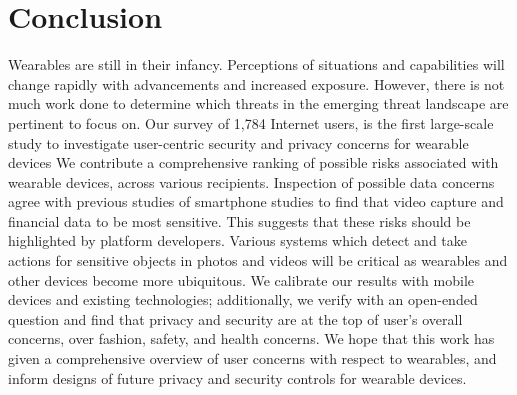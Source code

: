 
\section{Conclusion}

Wearables are still in their infancy. Perceptions of situations and capabilities will change rapidly with advancements and increased exposure. However, there is not much work done to determine which threats in the emerging threat landscape are pertinent to focus on. Our survey of 1,784 Internet users, is the first large-scale study to investigate user-centric security and privacy concerns for wearable devices We contribute a comprehensive ranking of possible risks associated with wearable devices, across various recipients. Inspection of possible data concerns agree with previous studies of smartphone studies to find that video capture and financial data to be most sensitive. This suggests that these risks should be highlighted by platform developers. Various systems which detect and take actions for sensitive objects in photos and videos will be critical as wearables and other devices become more ubiquitous. We calibrate our results with mobile devices and existing technologies; additionally, we verify with an open-ended question and find that privacy and security are at the top of user's overall concerns, over fashion, safety, and health concerns. We hope that this work has given a comprehensive overview of user concerns with respect to wearables, and inform designs of future privacy and security controls for wearable devices. 